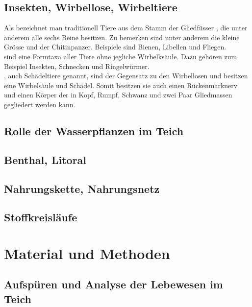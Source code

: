 \documentclass{article}
\begin{document}
    \subsection{Insekten, Wirbellose, Wirbeltiere}
    
        Als  bezeichnet man traditionell Tiere aus dem Stamm der Gliedfüsser , die unter anderem alle sechs Beine besitzen. Zu bemerken sind unter anderem die kleine Grösse und der Chitinpanzer. Beispiele sind Bienen, Libellen und Fliegen. \cite{EvolutionofInsects} \\
         sind eine Formtaxa \cite{UniProtokolle} aller Tiere ohne jegliche Wirbelksäule. Dazu gehören zum Beispiel Insekten, Schnecken und Ringelwürmer. \cite{FrustfreiLernen} \\
        , auch Schädeltiere genannt, sind der Gegensatz zu den Wirbellosen und besitzen eine Wirbelsäule und Schädel. Somit besitzen sie auch einen Rückenmarknerv und einen Körper der in Kopf, Rumpf, Schwanz und zwei Paar Gliedmassen gegliedert werden kann. \cite{Lernhelfer}
        
        
    \subsection{Rolle der Wasserpflanzen im Teich}
    
    \subsection{Benthal, Litoral}
    
    \subsection{Nahrungskette, Nahrungsnetz}
    
    \subsection{Stoffkreisläufe}


\section{Material und Methoden}
    
    \subsection{Aufspüren und Analyse der Lebewesen im Teich}
    
\end{document}
